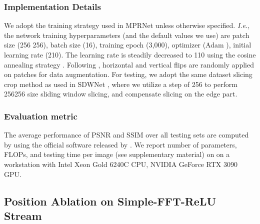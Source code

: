 \documentclass[letterpaper]{article} \usepackage{aaai23}  \usepackage{times}  \usepackage{helvet}  \usepackage{courier}  \usepackage[hyphens]{url}  \usepackage{graphicx} \usepackage{enumitem}
\begin{document}
\subsubsection{Implementation Details} We adopt the training strategy used in MPRNet \cite{Zamir2021multi} unless otherwise specified. \textit{I.e.}, the network training hyperparameters (and the default values we use) are patch size (256 256), batch size (16), training epoch (3,000), optimizer (Adam \cite{Kingma2015adam}), initial learning rate (210). The learning rate is steadily decreased to 110 using the cosine annealing strategy \cite{Loshchilov2017sgdr}. Following \cite{Zamir2021multi}, horizontal and vertical flips are randomly applied on patches for data augmentation. For testing, we adopt the same dataset slicing crop method as used in SDWNet \cite{Zou2021sdwnet}, where we utilize a step of 256 to perform 256256 size sliding window slicing, and compensate slicing on the edge part.

\subsubsection{Evaluation metric} The average performance of PSNR and SSIM over all testing sets are computed by using the official software released by \cite{Zamir2021multi}. We report number of parameters, FLOPs, and testing time per image (see supplementary material) on on a workstation with Intel Xeon Gold 6240C CPU, NVIDIA GeForce RTX 3090 GPU.

\subsection{Position Ablation on Simple-FFT-ReLU Stream}
\end{document}
